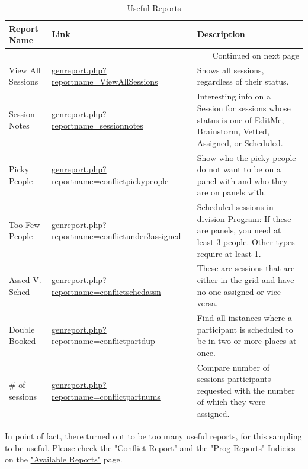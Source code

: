 \documentclass[captions=tablesignature]{scrartcl}
\begin{document}
\begin{tiny}
\begin{longtable}{|l|l|l|}
\caption{\label{tbl:usefulreports}Useful Reports}
\\
\hline
Report Name & Link & Description\\
\hline
\endhead
\hline\multicolumn{3}{r}{Continued on next page} \\
\endfoot
\endlastfoot
View All Sessions & \href{../webpages/genreport.php?reportname=ViewAllSessions}{genreport.php?reportname=ViewAllSessions} & Shows all sessions, regardless of their status.\\
Session Notes & \href{../webpages/genreport.php?reportname=sessionnotes}{genreport.php?reportname=sessionnotes} & Interesting info on a Session for sessions whose status is one of EditMe, Brainstorm, Vetted, Assigned, or Scheduled.\\
Picky People & \href{../webpages/genreport.php?reportname=conflictpickypeople}{genreport.php?reportname=conflictpickypeople} & Show who the picky people do not want to be on a panel with and who they are on panels with.\\
Too Few People & \href{../webpages/genreport.php?reportname=conflictunder3assigned}{genreport.php?reportname=conflictunder3assigned} & Scheduled sessions in division Program: If these are panels, you need at least 3 people. Other types require at least 1.\\
Assed V. Sched & \href{../webpages/genreport.php?reportname=conflictschedassn}{genreport.php?reportname=conflictschedassn} & These are sessions that are either in the grid and have no one assigned or vice versa.\\
Double Booked & \href{../webpages/genreport.php?reportname=conflictpartdup}{genreport.php?reportname=conflictpartdup} & Find all instances where a participant is scheduled to be in two or more places at once.\\
\# of sessions & \href{../webpages/genreport.php?reportname=conflictpartnums}{genreport.php?reportname=conflictpartnums} & Compare number of sessions participants requested with the number of which they were assigned.\\
\hline
\end{longtable}
\end{tiny}

In point of fact, there turned out to be too many useful reports,
for this sampling to be useful.  Please check the \href{../webpages/genindex.php?gflowname=Conflict}{"Conflict Report"}
and the \href{../webpages/genindex.php?gflowname=Prog}{"Prog Reports"} Indicies on the \href{../webpages/genindex.php}{"Available Reports"} page.
\end{document}
